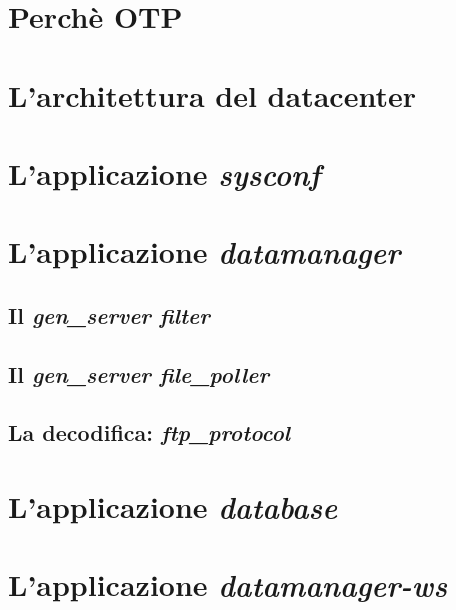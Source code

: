 
\section{Perch\`e OTP}

\section{L'architettura del datacenter}
\label{datacenter-arch}
\section{L'applicazione \emph{sysconf}}
\section{L'applicazione \emph{datamanager}}
\subsection{Il \emph{gen\_server filter}}
\subsection{Il \emph{gen\_server file\_poller}}
\subsection{La decodifica: \emph{ftp\_protocol}}
\section{L'applicazione \emph{database}}
\section{L'applicazione \emph{datamanager-ws}}
